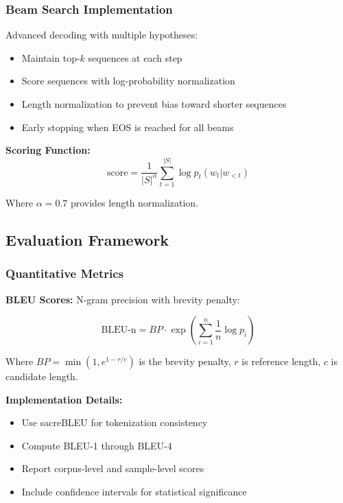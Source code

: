 \documentclass[conference]{IEEEtran}
\begin{document}
\subsubsection{Beam Search Implementation}
\label{sec:q1_beam_search}

Advanced decoding with multiple hypotheses:
\begin{itemize}
  \item Maintain top-$k$ sequences at each step
  \item Score sequences with log-probability normalization
  \item Length normalization to prevent bias toward shorter sequences
  \item Early stopping when EOS is reached for all beams
\end{itemize}

\textbf{Scoring Function:}
\begin{equation}
\text{score} = \frac{1}{|S|^\alpha} \sum_{t=1}^{|S|} \log p_t(w_t | w_{<t})
\end{equation}

Where $\alpha = 0.7$ provides length normalization.

\subsection{Evaluation Framework}
\label{sec:q1_evaluation}

\subsubsection{Quantitative Metrics}
\label{sec:q1_quantitative_eval}

\textbf{BLEU Scores:} N-gram precision with brevity penalty:

\begin{equation}
\text{BLEU-n} = BP \cdot \exp\left(\sum_{i=1}^{n} \frac{1}{n} \log p_i\right)
\end{equation}

Where $BP = \min(1, e^{1 - r/c})$ is the brevity penalty, $r$ is reference length, $c$ is candidate length.

\textbf{Implementation Details:}
\begin{itemize}
  \item Use sacreBLEU for tokenization consistency
  \item Compute BLEU-1 through BLEU-4
  \item Report corpus-level and sample-level scores
  \item Include confidence intervals for statistical significance
\end{itemize}
\end{document}
